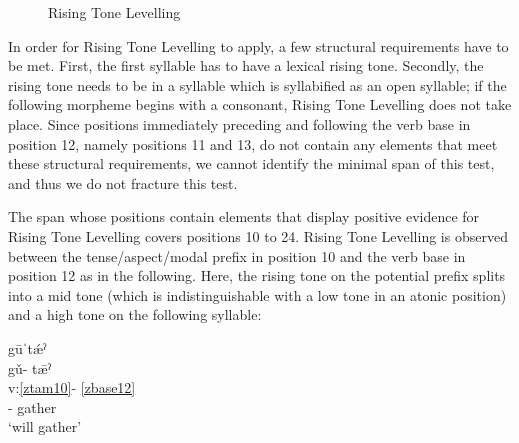 \documentclass[output=paper]{langscibook}
\begin{document}
\begin{figure}
    \caption{Rising Tone Levelling}
    \label{fig:zaprising}
\end{figure}

In order for Rising Tone Levelling to apply, a few structural requirements have to be met. First, the first syllable has to have a lexical rising tone. Secondly, the rising tone needs to be in a syllable which is syllabified as an open syllable; if the following morpheme begins with a consonant, Rising Tone Levelling does not take place. Since positions immediately preceding and following the verb base in position 12, namely positions 11 and 13, do not contain any elements that meet these structural requirements, we cannot identify the minimal span of this test, and thus we do not fracture this test. 

\newpage
The span whose positions contain elements that display positive evidence for Rising Tone Levelling covers positions 10 to 24. Rising Tone Levelling is observed between the tense/aspect/modal prefix in position 10 and the verb base in position 12 as in the following. Here, the rising tone on the potential prefix splits into a mid tone (which is indistinguishable with a low tone in an atonic position) and a high tone on the following syllable:

\ea\label{ex:key:zap:68}
{gūˈt\'{æ}ˀ}\\
\glll gǔ{}- t\={æ}ˀ\\
v:\ref{ztam10}- \ref{zbase12} \\
\Pot{}- gather\\
\glt `will gather'
\z
\end{document}
